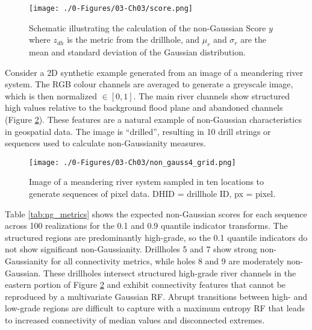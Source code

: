 \begin{figure}[htb!]
    \centering
    \texttt{[image: ./0-Figures/03-Ch03/score.png]}
    \caption{Schematic illustrating the calculation of the non-Gaussian Score $y$ where $z_{dh}$ is the metric from the drillhole, and $\mu_{r}$ and $\sigma_{r}$ are the mean and standard deviation of the Gaussian distribution.}
    \label{fig:score}
\end{figure}

Consider a \gls{2D} synthetic example generated from an image of a meandering river system. The \gls{RGB} colour channels are averaged to generate a greyscale image, which is then normalized $\in [0,1]$. The main river channels show structured high values relative to the background flood plane and abandoned channels (Figure \ref{fig:non_gauss4_grid}). These features are a natural example of non-Gaussian characteristics in geospatial data. The image is ``drilled'', resulting in 10 drill strings or sequences used to calculate non-Gaussianity measures.

\begin{figure}[htb!]
    \centering
    \texttt{[image: ./0-Figures/03-Ch03/non\_gauss4\_grid.png]}
    \caption{Image of a meandering river system sampled in ten locations to generate sequences of pixel data. DHID = drillhole ID, px = pixel. }
    \label{fig:non_gauss4_grid}
\end{figure}

Table \ref{tab:ng_metrics} shows the expected non-Gaussian scores for each sequence across 100 realizations for the 0.1 and 0.9 quantile indicator transforms. The structured regions are predominantly high-grade, so the 0.1 quantile indicators do not show significant non-Gaussianity. Drillholes 5 and 7 show strong non-Gaussianity for all connectivity metrics, while holes 8 and 9 are moderately non-Gaussian. These drillholes intersect structured high-grade river channels in the eastern portion of Figure \ref{fig:non_gauss4_grid} and exhibit connectivity features that cannot be reproduced by a multivariate Gaussian \gls{RF}. Abrupt transitions between high- and low-grade regions are difficult to capture with a maximum entropy \gls{RF} that leads to increased connectivity of median values and disconnected extremes.

\begin{table}[!htb]
    \centering
    \caption{Non-Gaussian metrics calculated for ten drillholes considering the 0.1 and 0.9 quantile indicator transforms. $y$-scores $\geq 2.5$ are considered strongly non-Gaussian. DHID corresponds to Figure \ref{fig:non_gauss4_grid}.}
    \resizebox{1\width}{!}{}
    \label{tab:ng_metrics}
\end{table}

